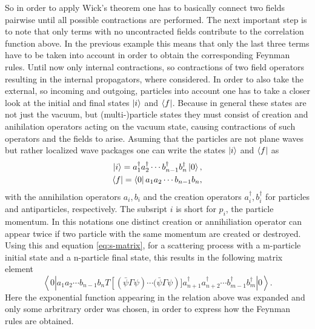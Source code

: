 So in order to apply Wick's theorem one has to basically connect two fields pairwise until all possible contractions are performed. \newline\indent
The next important step is to note that only terms with no uncontracted fields contribute to the correlation function above. In the previous example this means that only the last three terms have to be taken into account in order to obtain the corresponding Feynman rules. \newline\indent
Until now only internal contractions, so contractions of two field operators resulting in the internal propagators, where considered. In order to also take the external, so incoming and outgoing, particles into account one has to take a closer look at the initial and final states $\ket{i}$ and $\bra{f}$. Because in general these states are not just the vacuum, but (multi-)particle states they must consist of creation and anihilation operators acting on the vacuum state, causing contractions of such operators and the fields to arise. Asuming that the particles are not plane waves but rather localized wave packages one can write the states $\ket{i}$ and $\bra{f}$ as\cite{Kopp:2016}
\begin{align*}
\ket{i}=a_1^\dagger a_2^\dagger \cdots b_{n-1}^\dagger b_n^\dagger \ket{0},
\\
\bra{f}=\bra{0}a_1 a_2 \cdots b_{n-1}b_n,
\end{align*}
with the annihilation operators $a_i,b_i$ and the creation operators $a_i^\dagger,b_i^\dagger$ for particles and antiparticles, respectively. The subsript $i$ is short for $p_i$, the particle momentum. In this notations one distinct creation or annihiliation operator can appear twice if two particle with the same momentum are created or destroyed. \newline\indent
Using this and equation \eqref{eq:s-matrix}, for a scattering process with a m-particle initial state and a n-particle final state, this results in the following matrix element \cite[Eq. 2.2]{Denner:1992vza}
\begin{equation}
\left<0\left|a_1 a_2 \cdots  b_{n-1} b_n T\left[\left(\bar{\psi}\Gamma\psi\right)\cdots(\bar{\psi}\Gamma\psi\right)]a_{n+1}^\dagger a_{n+2}^\dagger \cdots  b_{m-1}^\dagger b_m^\dagger\right|0\right>.
\label{eq:matrix_element}
\end{equation}
Here the exponential function appearing in the relation above was expanded and only some arbritrary order was chosen, in order to express how the Feynman rules are obtained.\newline\indent

